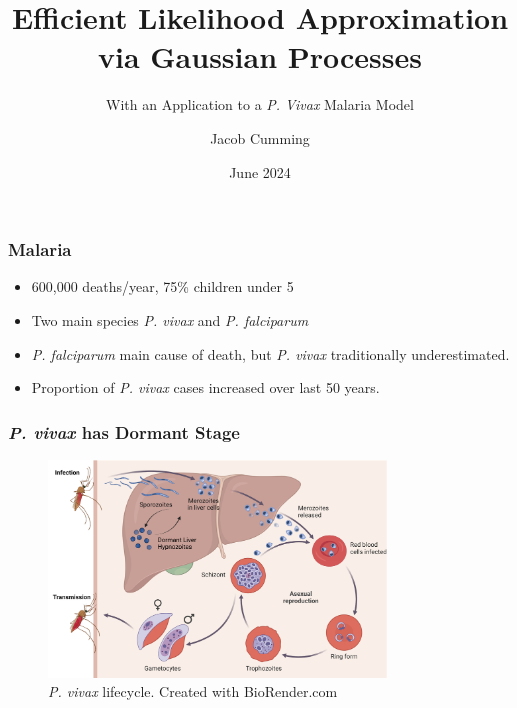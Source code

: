 \documentclass{beamer}
\title{Efficient Likelihood Approximation via Gaussian Processes}
\subtitle{With an Application to a \emph{P. Vivax} Malaria Model}
\author{Jacob Cumming}
\institute{University of Melbourne, Walter and Eliza Hall Institute}
\date{June 2024}
\begin{document}
\frame{\titlepage}


\begin{frame}
    \frametitle{Malaria}
    \begin{itemize}
        \item 600,000 deaths/year, 75\% children under 5
        \item Two main species \emph{P. vivax} and \emph{P. falciparum}
        \item \emph{P. falciparum} main cause of death, but
              \emph{P. vivax} traditionally underestimated.
        \item Proportion of \emph{P. vivax} cases increased over last 50 years.
    \end{itemize}
\end{frame}

\begin{frame}
    \frametitle{\emph{P. vivax} has Dormant Stage}
    \begin{figure}
        \centering
        \includegraphics[width=0.8\textwidth]{vivax_lifecycle_full.pdf}
        \caption{\emph{P. vivax} lifecycle. Created with BioRender.com}
    \end{figure}
\end{frame}
\end{document}
